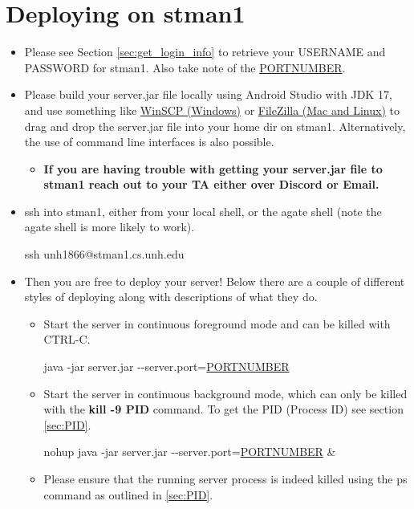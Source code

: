 \documentclass{article}
\begin{document}
\section{Deploying on stman1}
\begin{itemize}
	\item Please see Section \ref{sec:get_login_info} to retrieve your USERNAME and PASSWORD for stman1. Also take note of the \underline{PORTNUMBER}.
	\item Please build your server.jar file locally using Android Studio with JDK 17, and use something like \href{https://winscp.net/eng/index.php}{WinSCP (Windows)} or \href{https://filezilla-project.org/}{FileZilla (Mac and Linux)} to drag and drop the server.jar file into your home dir on stman1. Alternatively, the use of command line interfaces is also possible.
	      \begin{itemize}
		      \item \textbf{If you are having trouble with getting your server.jar file to stman1 reach out to your TA either over Discord or Email.}
	      \end{itemize}
	\item ssh into stman1, either from your local shell, or the agate shell (note the agate shell is more likely to work).
	      \begin{tcolorbox}
		      ssh unh1866@stman1.cs.unh.edu
	      \end{tcolorbox}
	\item Then you are free to deploy your server! Below there are a couple of different styles of deploying along with descriptions of what they do.
	      \begin{itemize}
		      \item Start the server in continuous foreground mode and can be killed with CTRL-C.
		            \begin{tcolorbox}
			            java -jar server.jar \mbox{-}\mbox{-}server.port=\underline{PORTNUMBER}
		            \end{tcolorbox}
		      \item Start the server in continuous background mode, which can only be killed with the \textbf{kill -9 PID} command. To get the PID (Process ID) see section \ref{sec:PID}.
		            \begin{tcolorbox}
			            nohup java -jar server.jar \mbox{-}\mbox{-}server.port=\underline{PORTNUMBER} \&
		            \end{tcolorbox}
		      \item Please ensure that the running server process is indeed killed using the ps command as outlined in \ref{sec:PID}.
	      \end{itemize}
\end{itemize}
\end{document}
